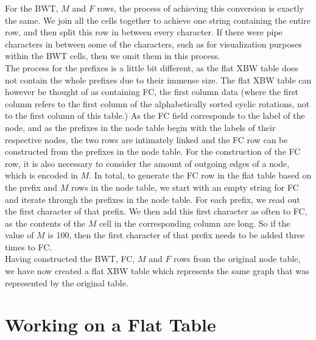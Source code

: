 \documentclass[a4paper,12pt,twoside,BCOR=10mm]{scrbook}
\begin{document}
For the BWT, $ M $ and $ F $ rows, the process of achieving this conversion is exactly the same.
We join all the cells together to achieve one string containing the entire
row, and then split this row in between every character.
If there were pipe characters in between some of the characters, such as
for visualization purposes within the BWT cells, then we omit them in this process. \\
The process for the prefixes is a little bit different, as the flat XBW table does
not contain the whole prefixes due to their immense size.
The flat XBW table can however be thought of as containing FC, the first column data (where
the first column refers to the first column of the alphabetically sorted cyclic rotations,
not to the first column of this table.)
As the FC field corresponds to the label of the node, and as the prefixes in the node table
begin with the labels of their respective nodes, the two rows are intimately linked
and the FC row can be constructed from the prefixes in the node table.
For the construction of the FC row, it is also necessary to consider the amount of
outgoing edges of a node, which is encoded in $ M $.
In total, to generate the FC row in the flat table based on the prefix and $ M $ rows in the
node table, we start with an empty string for FC and iterate through the prefixes in the node table.
For each prefix, we read out the first character of that prefix.
We then add this first character as often to FC, as the contents of the $ M $ cell
in the corresponding column are long. So if the value of $ M $ is 100,
then the first character of that prefix needs to be added three times to FC. \\
Having constructed the BWT, FC, $ M $ and $ F $ rows from the original node table,
we have now created a flat XBW table which represents the same graph that was represented
by the original table.

\section{Working on a Flat Table}
%
\end{document}
